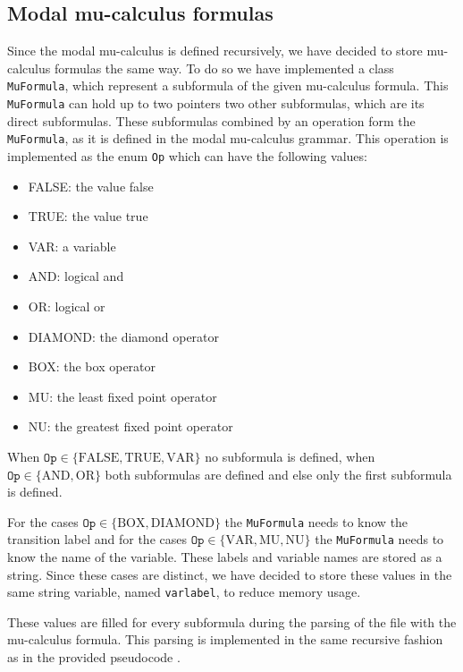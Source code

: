 \documentclass[10pt,a4paper]{article}
\begin{document}
\subsection{Modal mu-calculus formulas}
Since the modal mu-calculus is defined recursively, we have decided to store mu-calculus formulas the same way. To do so we have implemented a class \texttt{MuFormula}, which represent a subformula of the given mu-calculus formula. This \texttt{MuFormula} can hold up to two pointers two other subformulas, which are its direct subformulas. These subformulas combined by an operation form the \texttt{MuFormula}, as it is defined in the modal mu-calculus grammar. This operation is implemented as the enum \texttt{Op} which can have the following values:

\begin{itemize}
\item FALSE: the value false
\item TRUE: the value true
\item VAR: a variable
\item AND: logical and
\item OR: logical or
\item DIAMOND: the diamond operator
\item BOX: the box operator
\item MU: the least fixed point operator
\item NU: the greatest fixed point operator
\end{itemize}

When $\texttt{Op} \in \{\text{FALSE}, \text{TRUE}, \text{VAR}\}$ no subformula is defined, when \\ $\texttt{Op} \in \{\text{AND}, \text{OR}\}$ both subformulas are defined and else only the first subformula is defined.

For the cases $\texttt{Op} \in \{\text{BOX}, \text{DIAMOND}\}$ the \texttt{MuFormula} needs to know the transition label and for the cases $\texttt{Op} \in \{\text{VAR}, \text{MU}, \text{NU}\}$ the \texttt{MuFormula} needs to know the name of the variable. These labels and variable names are stored as a string. Since these cases are distinct, we have decided to store these values in the same string variable, named \texttt{varlabel}, to reduce memory usage.

These values are filled for every subformula during the parsing of the file with the mu-calculus formula. This parsing is implemented in the same recursive fashion as in the provided pseudocode \cite{muparse}.
\end{document}
